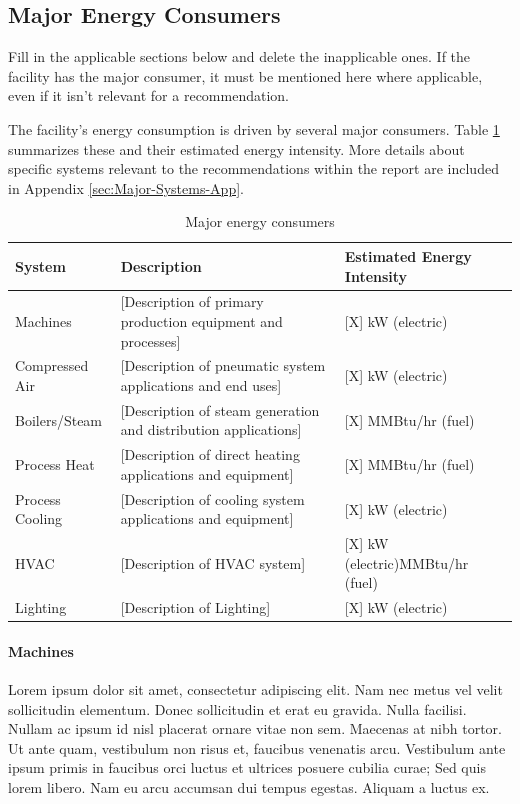 \subsection{Major Energy Consumers}

\begin{tcolorbox}[colback=green!25]
    Fill in the applicable sections below and delete the inapplicable ones. If the facility has the major consumer, it must be mentioned here where applicable, even if it isn't relevant for a recommendation. 
\end{tcolorbox}

The facility's energy consumption is driven by several major consumers. Table \ref{tab-energy-consumers} summarizes these and their estimated energy intensity. More details about specific systems relevant to the recommendations within the report are included in Appendix \ref{sec:Major-Systems-App}. 

\begin{table}[H]
\centering \small 
\caption{Major energy consumers}
\label{tab-energy-consumers}
\begin{tabular}{@{}p{2.5cm}p{6cm}p{4.5cm}@{}}
\toprule
\textbf{System} & \textbf{Description} & \textbf{Estimated Energy Intensity} \\ \midrule
Machines & [Description of primary production equipment and processes] & [X] kW (electric) \\[1.5ex]
Compressed Air & [Description of pneumatic system applications and end uses] & [X] kW (electric) \\[1.5ex]
Boilers/Steam & [Description of steam generation and distribution applications] & [X] MMBtu/hr (fuel) \\[1.5ex]
Process Heat & [Description of direct heating applications and equipment] & [X] MMBtu/hr (fuel) \\[1.5ex]
Process Cooling & [Description of cooling system applications and equipment] & [X] kW (electric) \\[1.5ex]
HVAC & [Description of HVAC system] & [X] kW (electric)\newline [X] MMBtu/hr (fuel)\\[1.5ex]
Lighting & [Description of Lighting] & [X] kW (electric)\\
\bottomrule
\end{tabular}
\end{table}
\paragraph{Machines} Lorem ipsum dolor sit amet, consectetur adipiscing elit. Nam nec metus vel velit sollicitudin elementum. Donec sollicitudin et erat eu gravida. Nulla facilisi. Nullam ac ipsum id nisl placerat ornare vitae non sem. Maecenas at nibh tortor. Ut ante quam, vestibulum non risus et, faucibus venenatis arcu. Vestibulum ante ipsum primis in faucibus orci luctus et ultrices posuere cubilia curae; Sed quis lorem libero. Nam eu arcu accumsan dui tempus egestas. Aliquam a luctus ex.

